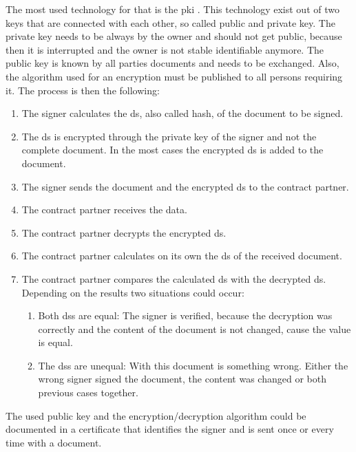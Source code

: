The most used technology for that is the \gls{pki} \parencite{CEFd2018}. This technology exist out of two keys that are connected with each other, so called public and private key. The private key needs to be always by the owner and should not get public, because then it is interrupted and the owner is not stable identifiable anymore. The public key is known by all parties documents and needs to be exchanged. Also, the algorithm used for an encryption must be published to all persons requiring it. The process is then the following:
\begin{enumerate}
	\item The signer calculates the \gls{ds}, also called hash, of the document to be signed.
	\item The \gls{ds} is encrypted through the private key of the signer and not the complete document. In the most cases the encrypted \gls{ds} is added to the document.
	\item The signer sends the document and the encrypted \gls{ds} to the contract partner.
	\item The contract partner receives the data.
	\item The contract partner decrypts the encrypted \gls{ds}.
	\item The contract partner calculates on its own the \gls{ds} of the received document.
	\item The contract partner compares the calculated \gls{ds} with the decrypted \gls{ds}. Depending on the results two situations could occur: 
	\begin{enumerate}
		\item Both \glspl{ds} are equal: \newline The signer is verified, because the decryption was correctly and the content of the document is not changed, cause the value is equal.
		\item The \glspl{ds} are unequal: \newline With this document is something wrong. Either the wrong signer signed the document, the content was changed or both previous cases together.
	\end{enumerate}
\end{enumerate}
The used public key and the encryption/decryption algorithm could be documented in a certificate that identifies the signer and is sent once or every time with a document.

